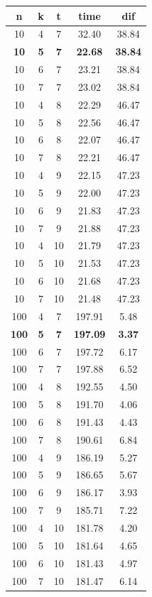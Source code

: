 \documentclass[wide,a4paper,titlepage,12pt] {article}
\begin{document}
\begin{center}
    \begin{tabular}{|c|c|c|c|c|}
\hline
n & k & t & time & dif \\
\hline
10 & 4 & 7 & 32.40 & 38.84 \\
\bf{10} & \bf{5} & \bf{7} & \bf{22.68} & \bf{38.84} \\
10 & 6 & 7 & 23.21 & 38.84 \\
10 & 7 & 7 & 23.02 & 38.84 \\
10 & 4 & 8 & 22.29 & 46.47 \\
10 & 5 & 8 & 22.56 & 46.47 \\
10 & 6 & 8 & 22.07 & 46.47 \\
10 & 7 & 8 & 22.21 & 46.47 \\
10 & 4 & 9 & 22.15 & 47.23 \\
10 & 5 & 9 & 22.00 & 47.23 \\
10 & 6 & 9 & 21.83 & 47.23 \\
10 & 7 & 9 & 21.88 & 47.23 \\
10 & 4 & 10 & 21.79 & 47.23 \\
10 & 5 & 10 & 21.53 & 47.23 \\
10 & 6 & 10 & 21.68 & 47.23 \\
10 & 7 & 10 & 21.48 & 47.23 \\
\hline
100 & 4 & 7 & 197.91 &  5.48 \\
\bf{100} & \bf{5} & \bf{7} & \bf{197.09} &  \bf{3.37} \\
100 & 6 & 7 & 197.72 &  6.17 \\
100 & 7 & 7 & 197.88 &  6.52 \\
100 & 4 & 8 & 192.55 &  4.50 \\
100 & 5 & 8 & 191.70 &  4.06 \\
100 & 6 & 8 & 191.43 &  4.43 \\
100 & 7 & 8 & 190.61 &  6.84 \\
100 & 4 & 9 & 186.19 &  5.27 \\
100 & 5 & 9 & 186.65 &  5.67 \\
100 & 6 & 9 & 186.17 &  3.93 \\
100 & 7 & 9 & 185.71 &  7.22 \\
100 & 4 & 10 & 181.78 &  4.20 \\
100 & 5 & 10 & 181.64 &  4.65 \\
100 & 6 & 10 & 181.43 &  4.97 \\
100 & 7 & 10 & 181.47 &  6.14 \\
\hline
    \end{tabular}
\end{center}
\end{document}

